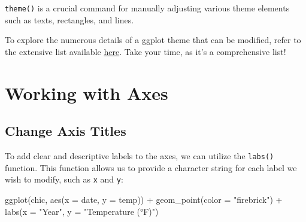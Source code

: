 \documentclass[
  letterpaper,
]{scrbook}
\newenvironment{Shaded}{\begin{snugshade}}{\end{snugshade}}
\newcommand{\AttributeTok}[1]{\textcolor[rgb]{0.40,0.45,0.13}{#1}}
\newcommand{\FunctionTok}[1]{\textcolor[rgb]{0.28,0.35,0.67}{#1}}
\newcommand{\NormalTok}[1]{\textcolor[rgb]{0.00,0.23,0.31}{#1}}
\newcommand{\SpecialCharTok}[1]{\textcolor[rgb]{0.37,0.37,0.37}{#1}}
\newcommand{\StringTok}[1]{\textcolor[rgb]{0.13,0.47,0.30}{#1}}
\begin{document}
\begin{tcolorbox}[enhanced jigsaw, toprule=.15mm, bottomtitle=1mm, coltitle=black, breakable, colbacktitle=quarto-callout-important-color!10!white, opacityback=0, toptitle=1mm, colframe=quarto-callout-important-color-frame, titlerule=0mm, title=\textcolor{quarto-callout-important-color}{\faExclamation}\hspace{0.5em}{Remember!}, bottomrule=.15mm, arc=.35mm, opacitybacktitle=0.6, leftrule=.75mm, left=2mm, rightrule=.15mm, colback=white]

\texttt{theme()} is a crucial command for manually adjusting various
theme elements such as texts, rectangles, and lines.

\end{tcolorbox}

To explore the numerous details of a ggplot theme that can be modified,
refer to the extensive list available
\href{https://ggplot2.tidyverse.org/reference/theme.html}{here}. Take
your time, as it's a comprehensive list!


\chapter{Working with Axes}\label{axes}

\section{Change Axis Titles}\label{change-axis-titles}

To add clear and descriptive labels to the axes, we can utilize the
\texttt{labs()} function. This function allows us to provide a character
string for each label we wish to modify, such as \texttt{x} and
\texttt{y}:

\begin{Shaded}
\begin{Highlighting}[]
\FunctionTok{ggplot}\NormalTok{(chic, }\FunctionTok{aes}\NormalTok{(}\AttributeTok{x =}\NormalTok{ date, }\AttributeTok{y =}\NormalTok{ temp)) }\SpecialCharTok{+}
  \FunctionTok{geom\_point}\NormalTok{(}\AttributeTok{color =} \StringTok{"firebrick"}\NormalTok{) }\SpecialCharTok{+}
  \FunctionTok{labs}\NormalTok{(}\AttributeTok{x =} \StringTok{"Year"}\NormalTok{, }\AttributeTok{y =} \StringTok{"Temperature (°F)"}\NormalTok{)}
\end{Highlighting}
\end{Shaded}
\end{document}
